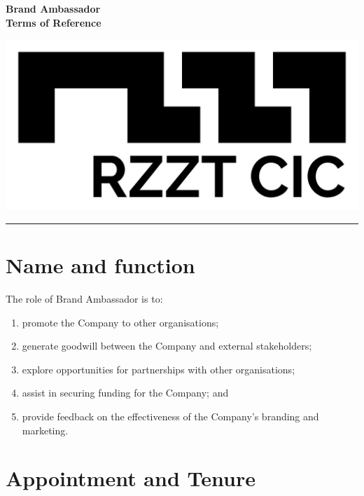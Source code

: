 \documentclass[a4paper,10pt]{article}
\renewcommand{\labelenumi}{(\arabic{enumi})}
\begin{document}
\thispagestyle{firstpage}

\begin{minipage}[b]{0.75\textwidth}
  \raggedright
  \LARGE{\textbf{Brand Ambassador\\Terms of Reference}}
  \vspace{0.2em}
\end{minipage}
%
\begin{minipage}[b]{0.25\textwidth}
  \raggedleft
  \includegraphics[width=1\textwidth]{logo-black.jpg}
\end{minipage}

\hrule

\vspace{2em}

\section{Name and function}

The role of Brand Ambassador is to:

\begin{enumerate}
    \renewcommand{\labelenumi}{(\alph{enumi})}
    \item promote the Company to other organisations;
    \item generate goodwill between the Company and external stakeholders;
    \item explore opportunities for partnerships with other organisations;
    \item assist in securing funding for the Company; and
    \item provide feedback on the effectiveness of the Company’s branding and marketing.
\end{enumerate}

\section{Appointment and Tenure}
\end{document}

